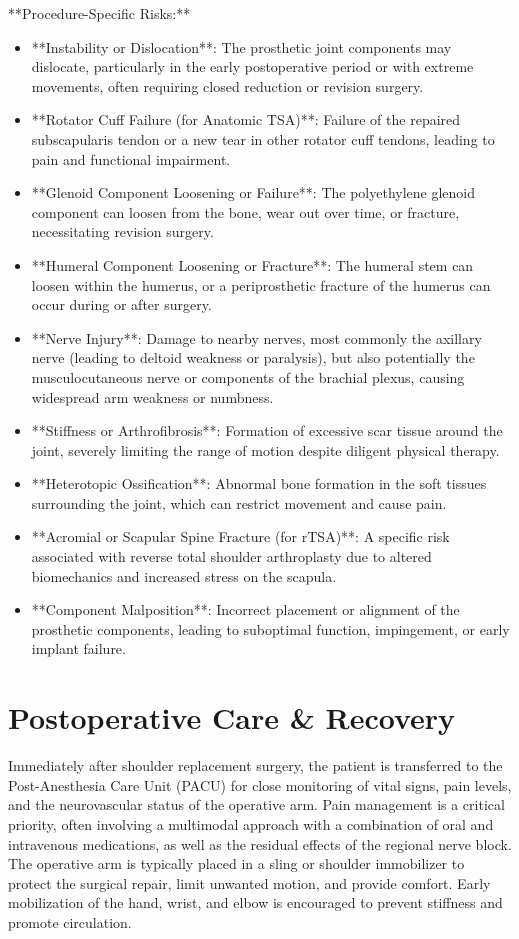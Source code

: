 **Procedure-Specific Risks:**
\begin{itemize}
  \item **Instability or Dislocation**: The prosthetic joint components may dislocate, particularly in the early postoperative period or with extreme movements, often requiring closed reduction or revision surgery.
  \item **Rotator Cuff Failure (for Anatomic TSA)**: Failure of the repaired subscapularis tendon or a new tear in other rotator cuff tendons, leading to pain and functional impairment.
  \item **Glenoid Component Loosening or Failure**: The polyethylene glenoid component can loosen from the bone, wear out over time, or fracture, necessitating revision surgery.
  \item **Humeral Component Loosening or Fracture**: The humeral stem can loosen within the humerus, or a periprosthetic fracture of the humerus can occur during or after surgery.
  \item **Nerve Injury**: Damage to nearby nerves, most commonly the axillary nerve (leading to deltoid weakness or paralysis), but also potentially the musculocutaneous nerve or components of the brachial plexus, causing widespread arm weakness or numbness.
  \item **Stiffness or Arthrofibrosis**: Formation of excessive scar tissue around the joint, severely limiting the range of motion despite diligent physical therapy.
  \item **Heterotopic Ossification**: Abnormal bone formation in the soft tissues surrounding the joint, which can restrict movement and cause pain.
  \item **Acromial or Scapular Spine Fracture (for rTSA)**: A specific risk associated with reverse total shoulder arthroplasty due to altered biomechanics and increased stress on the scapula.
  \item **Component Malposition**: Incorrect placement or alignment of the prosthetic components, leading to suboptimal function, impingement, or early implant failure.
\end{itemize}

\section*{Postoperative Care \& Recovery}
Immediately after shoulder replacement surgery, the patient is transferred to the Post-Anesthesia Care Unit (PACU) for close monitoring of vital signs, pain levels, and the neurovascular status of the operative arm. Pain management is a critical priority, often involving a multimodal approach with a combination of oral and intravenous medications, as well as the residual effects of the regional nerve block. The operative arm is typically placed in a sling or shoulder immobilizer to protect the surgical repair, limit unwanted motion, and provide comfort. Early mobilization of the hand, wrist, and elbow is encouraged to prevent stiffness and promote circulation.

